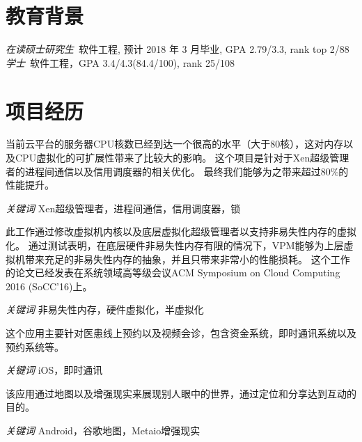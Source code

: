 \documentclass{resume}
\begin{document}


 
\section{教育背景}
\textit{在读硕士研究生}\ 软件工程, 预计 2018 年 3 月毕业, GPA 2.79/3.3, rank top 2/88
\textit{学士}\ 软件工程，GPA 3.4/4.3(84.4/100), rank 25/108

\section{项目经历}
当前云平台的服务器CPU核数已经到达一个很高的水平（大于80核），这对内存以及CPU虚拟化的可扩展性带来了比较大的影响。
这个项目是针对于Xen超级管理者的进程间通信以及信用调度器的相关优化。
最终我们能够为之带来超过80\%的性能提升。

\textit{关键词} Xen超级管理者，进程间通信，信用调度器，锁

此工作通过修改虚拟机内核以及底层虚拟化超级管理者以支持非易失性内存的虚拟化。
通过测试表明，在底层硬件非易失性内存有限的情况下，VPM能够为上层虚拟机带来充足的非易失性内存的抽象，并且只带来非常小的性能损耗。
这个工作的论文已经发表在系统领域高等级会议ACM Symposium on Cloud Computing 2016 (SoCC'16)上。

\textit{关键词} 非易失性内存，硬件虚拟化，半虚拟化


这个应用主要针对医患线上预约以及视频会诊，包含资金系统，即时通讯系统以及预约系统等。

\textit{关键词} iOS，即时通讯

该应用通过地图以及增强现实来展现别人眼中的世界，通过定位和分享达到互动的目的。

\textit{关键词} Android，谷歌地图，Metaio增强现实


\end{document}
